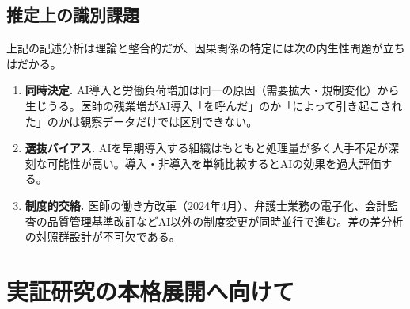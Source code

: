 \documentclass[11pt]{article}
\theoremstyle{plain}
\theoremstyle{definition}
\theoremstyle{remark}
\begin{document}
\subsection{推定上の識別課題}
上記の記述分析は理論と整合的だが、因果関係の特定には次の内生性問題が立ちはだかる。
\begin{enumerate}[label=(\roman*),leftmargin=1.8em,itemsep=2pt]
\item \textbf{同時決定.} AI導入と労働負荷増加は同一の原因（需要拡大・規制変化）から生じうる。医師の残業増がAI導入「を呼んだ」のか「によって引き起こされた」のかは観察データだけでは区別できない。
\item \textbf{選抜バイアス.} AIを早期導入する組織はもともと処理量が多く人手不足が深刻な可能性が高い。導入・非導入を単純比較するとAIの効果を過大評価する。
\item \textbf{制度的交絡.} 医師の働き方改革（2024年4月）、弁護士業務の電子化、会計監査の品質管理基準改訂などAI以外の制度変更が同時並行で進む。差の差分析の対照群設計が不可欠である。
\end{enumerate}

\section{実証研究の本格展開へ向けて}
\end{document}
